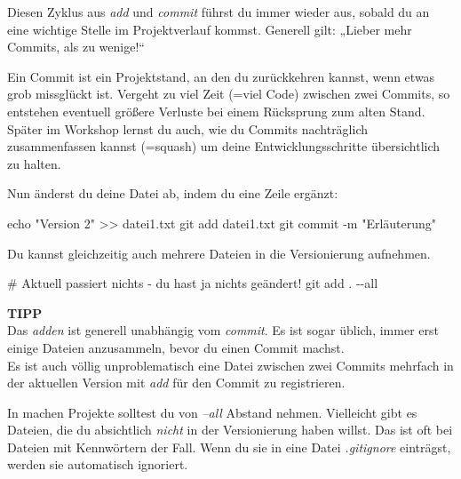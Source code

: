 \documentclass[
  letterpaper,
  DIV=11]{scrreprt}
\newenvironment{Shaded}{\begin{snugshade}}{\end{snugshade}}
\newcommand{\AttributeTok}[1]{\textcolor[rgb]{0.40,0.45,0.13}{#1}}
\newcommand{\BuiltInTok}[1]{\textcolor[rgb]{0.00,0.23,0.31}{#1}}
\newcommand{\CommentTok}[1]{\textcolor[rgb]{0.37,0.37,0.37}{#1}}
\newcommand{\FunctionTok}[1]{\textcolor[rgb]{0.28,0.35,0.67}{#1}}
\newcommand{\NormalTok}[1]{\textcolor[rgb]{0.00,0.23,0.31}{#1}}
\newcommand{\OperatorTok}[1]{\textcolor[rgb]{0.37,0.37,0.37}{#1}}
\newcommand{\StringTok}[1]{\textcolor[rgb]{0.13,0.47,0.30}{#1}}
\newcommand{\datei}[1]{\textit{#1}\xspace}
\begin{document}
Diesen Zyklus aus \emph{add} und \emph{commit} führst du immer wieder
aus, sobald du an eine wichtige Stelle im Projektverlauf kommst.
Generell gilt: „Lieber mehr Commits, als zu wenige!{}``

Ein Commit ist ein Projektstand, an den du zurückkehren kannst, wenn
etwas grob missglückt ist. Vergeht zu viel Zeit (=viel Code) zwischen
zwei Commits, so entstehen eventuell größere Verluste bei einem
Rücksprung zum alten Stand.\\
Später im Workshop lernst du auch, wie du Commits nachträglich
zusammenfassen kannst (=squash) um deine Entwicklungsschritte
übersichtlich zu halten.

Nun änderst du deine Datei ab, indem du eine Zeile ergänzt:

\begin{Shaded}
\begin{Highlighting}[]
\BuiltInTok{echo} \StringTok{"Version 2"} \OperatorTok{\textgreater{}\textgreater{}}\NormalTok{ datei1.txt }
\FunctionTok{git}\NormalTok{ add datei1.txt }
\FunctionTok{git}\NormalTok{ commit }\AttributeTok{{-}m} \StringTok{"Erläuterung"}
\end{Highlighting}
\end{Shaded}

Du kannst gleichzeitig auch mehrere Dateien in die Versionierung
aufnehmen.

\begin{Shaded}
\begin{Highlighting}[]
\CommentTok{\# Aktuell passiert nichts {-} du hast ja nichts geändert!}
\FunctionTok{git}\NormalTok{ add . }\AttributeTok{{-}{-}all} 
\end{Highlighting}
\end{Shaded}

\samplestart

\textbf{TIPP}\\
Das \emph{adden} ist generell unabhängig vom \emph{commit}. Es ist sogar
üblich, immer erst einige Dateien anzusammeln, bevor du einen Commit
machst.\\
Es ist auch völlig unproblematisch eine Datei zwischen zwei Commits
mehrfach in der aktuellen Version mit \emph{add} für den Commit zu
registrieren.

In machen Projekte solltest du von \emph{--all} Abstand nehmen.
Vielleicht gibt es Dateien, die du absichtlich \emph{nicht} in der
Versionierung haben willst. Das ist oft bei Dateien mit Kennwörtern der
Fall. Wenn du sie in eine Datei \datei{.gitignore} einträgst, werden sie
automatisch ignoriert. \sampleend
\end{document}
